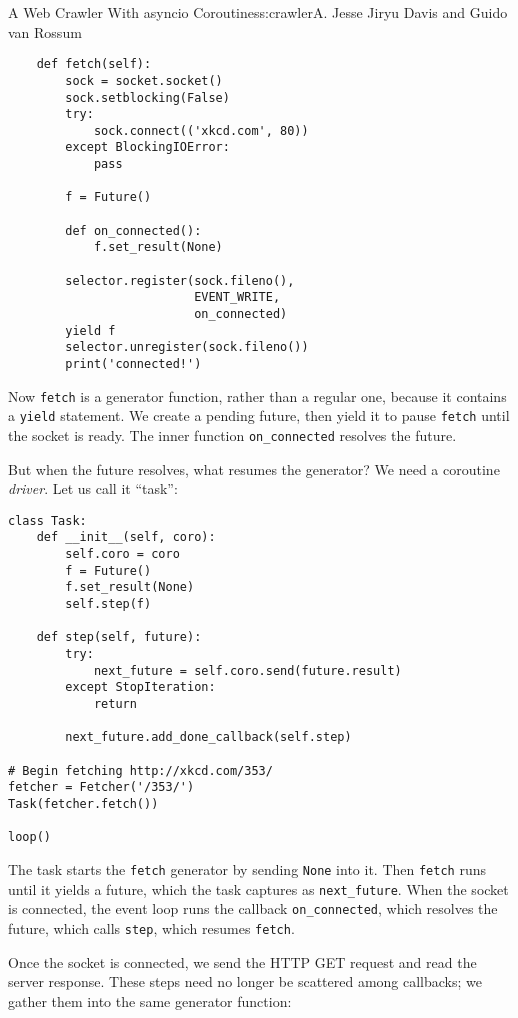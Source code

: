 \begin{aosachapter}{A Web Crawler With asyncio Coroutines}{s:crawler}{A. Jesse Jiryu Davis and Guido van Rossum}
\begin{verbatim}
    def fetch(self):
        sock = socket.socket()
        sock.setblocking(False)
        try:
            sock.connect(('xkcd.com', 80))
        except BlockingIOError:
            pass

        f = Future()

        def on_connected():
            f.set_result(None)

        selector.register(sock.fileno(),
                          EVENT_WRITE,
                          on_connected)
        yield f
        selector.unregister(sock.fileno())
        print('connected!')
\end{verbatim}

Now \texttt{fetch} is a generator function, rather than a regular one,
because it contains a \texttt{yield} statement. We create a pending
future, then yield it to pause \texttt{fetch} until the socket is ready.
The inner function \texttt{on\_connected} resolves the future.

But when the future resolves, what resumes the generator? We need a
coroutine \emph{driver}. Let us call it ``task'':

\begin{verbatim}
class Task:
    def __init__(self, coro):
        self.coro = coro
        f = Future()
        f.set_result(None)
        self.step(f)

    def step(self, future):
        try:
            next_future = self.coro.send(future.result)
        except StopIteration:
            return

        next_future.add_done_callback(self.step)

# Begin fetching http://xkcd.com/353/
fetcher = Fetcher('/353/')
Task(fetcher.fetch())

loop()
\end{verbatim}

The task starts the \texttt{fetch} generator by sending \texttt{None}
into it. Then \texttt{fetch} runs until it yields a future, which the
task captures as \texttt{next\_future}. When the socket is connected,
the event loop runs the callback \texttt{on\_connected}, which resolves
the future, which calls \texttt{step}, which resumes \texttt{fetch}.

\label{factoring-coroutines-with-yield-from}

Once the socket is connected, we send the HTTP GET request and read the
server response. These steps need no longer be scattered among
callbacks; we gather them into the same generator function:


\end{aosachapter}
